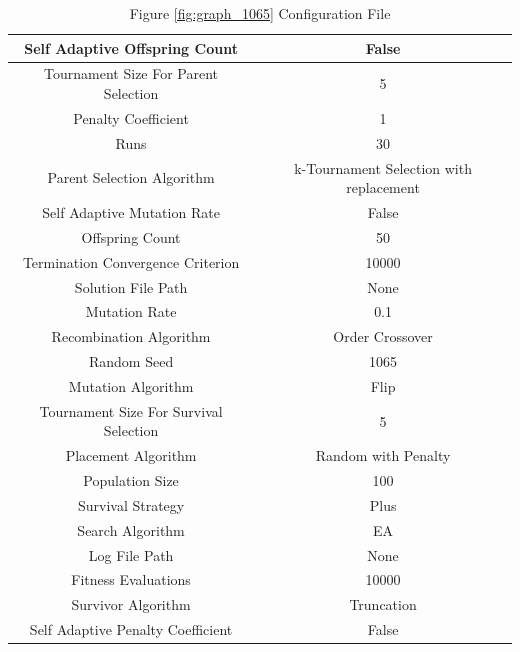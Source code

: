 \documentclass{standalone}
\begin{document}
\begin{table}[!htb]
	\centering
	\caption{Figure \ref{fig:graph_1065} Configuration File}
	\label{tab:graph_1065}
	\begin{tabular}{| c | c |}
		\hline
		Self Adaptive Offspring Count		& False		 \\
		\hline
		Tournament Size For Parent Selection		& 5		 \\
		\hline
		Penalty Coefficient		& 1		 \\
		\hline
		Runs		& 30		 \\
		\hline
		Parent Selection Algorithm		& k-Tournament Selection with replacement		 \\
		\hline
		Self Adaptive Mutation Rate		& False		 \\
		\hline
		Offspring Count		& 50		 \\
		\hline
		Termination Convergence Criterion		& 10000		 \\
		\hline
		Solution File Path		& None		 \\
		\hline
		Mutation Rate		& 0.1		 \\
		\hline
		Recombination Algorithm		& Order Crossover		 \\
		\hline
		Random Seed		& 1065		 \\
		\hline
		Mutation Algorithm		& Flip		 \\
		\hline
		Tournament Size For Survival Selection		& 5		 \\
		\hline
		Placement Algorithm		& Random with Penalty		 \\
		\hline
		Population Size		& 100		 \\
		\hline
		Survival Strategy		& Plus		 \\
		\hline
		Search Algorithm		& EA		 \\
		\hline
		Log File Path		& None		 \\
		\hline
		Fitness Evaluations		& 10000		 \\
		\hline
		Survivor Algorithm		& Truncation		 \\
		\hline
		Self Adaptive Penalty Coefficient		& False		 \\
		\hline
	\end{tabular}
\end{table}
\end{document}
